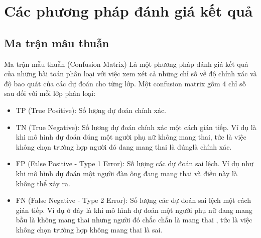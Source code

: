 




\section{Các phương pháp đánh giá kết quả}

\subsection{Ma trận mâu thuẫn}
Ma trận mẫu thuẫn (Confusion Matrix) Là một phương pháp đánh giá kết quả của những bài toán phân loại với việc xem xét cả những chỉ số về độ chính xác và độ bao quát của các dự đoán cho từng lớp. Một confusion matrix gồm 4 chỉ số sau đối với mỗi lớp phân loại:

\begin{itemize}
    \item TP (True Positive): Số lượng dự đoán chính xác.
    \item TN (True Negative): Số lương dự đoán chính xác một cách gián tiếp. Ví dụ là khi mô hình dự đoán đúng một người phụ nữ không mang thai, tức là việc không chọn trường hợp người đó đang mang thai là đúnglà chính xác.
    \item FP (False Positive - Type 1 Error): Số lượng các dự đoán sai lệch. Ví dụ như khi mô hình dự đoán một người đàn ông đang mang thai và điều này là không thể xảy ra.
    \item FN (False Negative - Type 2 Error): Số lượng các dự đoán sai lệch một cách gián tiếp. Ví dụ ở đây là khi mô hình dự đoán một người phụ nữ đang mang bầu là không mang thai nhưng người đó chắc chắn là mang thai , tức là việc không chọn trường hợp không mang thai là sai. 
\end{itemize}

